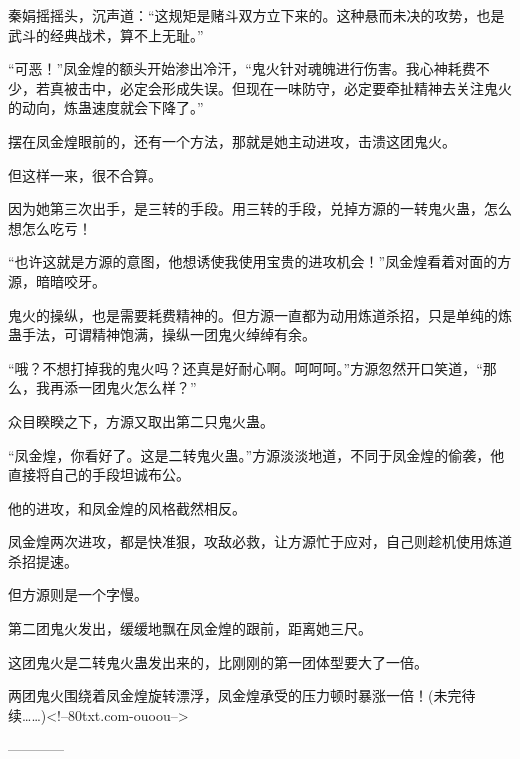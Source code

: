\begin{this_body}
秦娟摇摇头，沉声道：“这规矩是赌斗双方立下来的。这种悬而未决的攻势，也是武斗的经典战术，算不上无耻。”

“可恶！”凤金煌的额头开始渗出冷汗，“鬼火针对魂魄进行伤害。我心神耗费不少，若真被击中，必定会形成失误。但现在一味防守，必定要牵扯精神去关注鬼火的动向，炼蛊速度就会下降了。”

摆在凤金煌眼前的，还有一个方法，那就是她主动进攻，击溃这团鬼火。

但这样一来，很不合算。

因为她第三次出手，是三转的手段。用三转的手段，兑掉方源的一转鬼火蛊，怎么想怎么吃亏！

“也许这就是方源的意图，他想诱使我使用宝贵的进攻机会！”凤金煌看着对面的方源，暗暗咬牙。

鬼火的操纵，也是需要耗费精神的。但方源一直都为动用炼道杀招，只是单纯的炼蛊手法，可谓精神饱满，操纵一团鬼火绰绰有余。

“哦？不想打掉我的鬼火吗？还真是好耐心啊。呵呵呵。”方源忽然开口笑道，“那么，我再添一团鬼火怎么样？”

众目睽睽之下，方源又取出第二只鬼火蛊。

“凤金煌，你看好了。这是二转鬼火蛊。”方源淡淡地道，不同于凤金煌的偷袭，他直接将自己的手段坦诚布公。

他的进攻，和凤金煌的风格截然相反。

凤金煌两次进攻，都是快准狠，攻敌必救，让方源忙于应对，自己则趁机使用炼道杀招提速。

但方源则是一个字慢。

第二团鬼火发出，缓缓地飘在凤金煌的跟前，距离她三尺。

这团鬼火是二转鬼火蛊发出来的，比刚刚的第一团体型要大了一倍。

两团鬼火围绕着凤金煌旋转漂浮，凤金煌承受的压力顿时暴涨一倍！(未完待续……)<!--80txt.com-ouoou-->

------------

\end{this_body}

